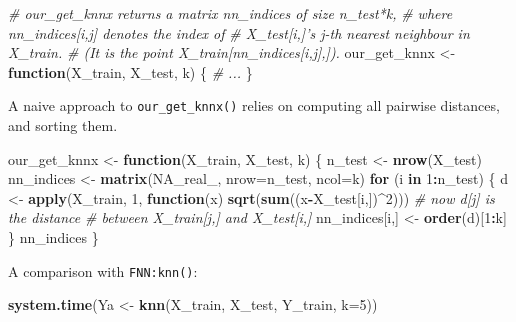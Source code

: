 \documentclass[10pt,b5paper,krantz1]{krantz}
\newenvironment{Shaded}{\begin{snugshade}}{\end{snugshade}}
\newcommand{\CommentTok}[1]{\textcolor[rgb]{0.37,0.37,0.37}{\textit{#1}}}
\newcommand{\ControlFlowTok}[1]{\textcolor[rgb]{0.27,0.27,0.27}{\textbf{#1}}}
\newcommand{\DataTypeTok}[1]{\textcolor[rgb]{0.27,0.27,0.27}{#1}}
\newcommand{\DecValTok}[1]{\textcolor[rgb]{0.06,0.06,0.06}{#1}}
\newcommand{\KeywordTok}[1]{\textcolor[rgb]{0.27,0.27,0.27}{\textbf{#1}}}
\newcommand{\NormalTok}[1]{#1}
\newcommand{\OperatorTok}[1]{\textcolor[rgb]{0.43,0.43,0.43}{\textbf{#1}}}
\newcommand{\OtherTok}[1]{\textcolor[rgb]{0.37,0.37,0.37}{#1}}
\newcommand{\StringTok}[1]{\textcolor[rgb]{0.5,0.5,0.5}{#1}}
\begin{document}
\begin{Shaded}
\begin{Highlighting}[]
\CommentTok{# our_get_knnx returns a matrix nn_indices of size n_test*k,}
\CommentTok{# where nn_indices[i,j] denotes the index of}
\CommentTok{# X_test[i,]'s j-th nearest neighbour in X_train.}
\CommentTok{# (It is the point X_train[nn_indices[i,j],]).}
\NormalTok{our_get_knnx <-}\StringTok{ }\ControlFlowTok{function}\NormalTok{(X_train, X_test, k) \{}
    \CommentTok{# ...}
\NormalTok{\}}
\end{Highlighting}
\end{Shaded}

A naive approach to \texttt{our\_get\_knnx()} relies on computing all pairwise distances,
and sorting them.

\begin{Shaded}
\begin{Highlighting}[]
\NormalTok{our_get_knnx <-}\StringTok{ }\ControlFlowTok{function}\NormalTok{(X_train, X_test, k) \{}
\NormalTok{    n_test <-}\StringTok{ }\KeywordTok{nrow}\NormalTok{(X_test)}
\NormalTok{    nn_indices <-}\StringTok{ }\KeywordTok{matrix}\NormalTok{(}\OtherTok{NA_real_}\NormalTok{, }\DataTypeTok{nrow=}\NormalTok{n_test, }\DataTypeTok{ncol=}\NormalTok{k)}
    \ControlFlowTok{for}\NormalTok{ (i }\ControlFlowTok{in} \DecValTok{1}\OperatorTok{:}\NormalTok{n_test) \{}
\NormalTok{        d <-}\StringTok{ }\KeywordTok{apply}\NormalTok{(X_train, }\DecValTok{1}\NormalTok{, }\ControlFlowTok{function}\NormalTok{(x)}
            \KeywordTok{sqrt}\NormalTok{(}\KeywordTok{sum}\NormalTok{((x}\OperatorTok{-}\NormalTok{X_test[i,])}\OperatorTok{^}\DecValTok{2}\NormalTok{)))}
        \CommentTok{# now d[j] is the distance}
        \CommentTok{# between X_train[j,] and X_test[i,]}
\NormalTok{        nn_indices[i,] <-}\StringTok{ }\KeywordTok{order}\NormalTok{(d)[}\DecValTok{1}\OperatorTok{:}\NormalTok{k]}
\NormalTok{    \}}
\NormalTok{    nn_indices}
\NormalTok{\}}
\end{Highlighting}
\end{Shaded}

A comparison with \texttt{FNN:knn()}:

\begin{Shaded}
\begin{Highlighting}[]
\KeywordTok{system.time}\NormalTok{(Ya <-}\StringTok{ }\KeywordTok{knn}\NormalTok{(X_train, X_test, Y_train, }\DataTypeTok{k=}\DecValTok{5}\NormalTok{))}
\end{Highlighting}
\end{Shaded}
\end{document}
